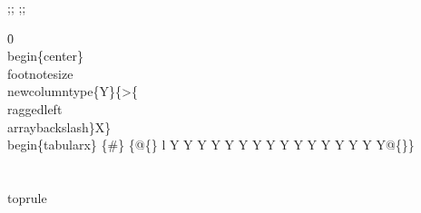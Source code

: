 {\ansi{}
{;;}
{\*\expandedcolortbl;;}
\pard{}

\f0  \\begin\{center\}\
\\footnotesize\
\\newcolumntype\{Y\}\{>\{\\raggedleft\\arraybackslash\}X\}\
\\begin\{tabularx\} \{#\} \{@\{\} l Y Y Y Y Y Y Y Y Y Y Y Y Y Y Y Y@\{\}\} \\\\\
\\toprule}